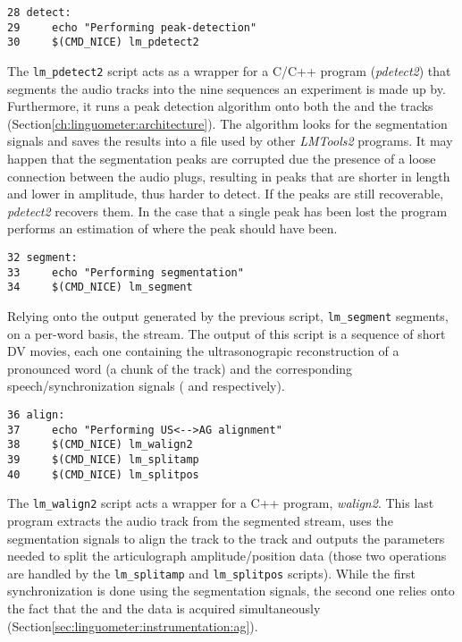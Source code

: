 \begin{scriptsize}
\begin{verbatim}
28 detect:
29     echo "Performing peak-detection"
30     $(CMD_NICE) lm_pdetect2
\end{verbatim}
\end{scriptsize}
The {\tt lm\_pdetect2} script acts as a wrapper for a C/C++ program 
(\emph{pdetect2}) that segments the  audio tracks into the nine 
sequences an experiment is made up by.
Furthermore, it runs a peak detection algorithm onto both the  
and the    tracks (Section\ref{ch:linguometer:architecture}).
The algorithm looks for the segmentation signals and saves the results
into a file used by other \emph{LMTools2} programs.
It may happen that the segmentation peaks are corrupted due the presence of a 
loose connection between the audio plugs, resulting in peaks that are shorter
in length and lower in amplitude, thus harder to detect.
If the peaks are still recoverable, \emph{pdetect2} recovers them. 
In the case that a single peak has been lost the program performs an estimation
of where the peak should have been.

\begin{scriptsize}
\begin{verbatim}
32 segment:
33     echo "Performing segmentation"
34     $(CMD_NICE) lm_segment
\end{verbatim}
\end{scriptsize}
Relying onto the output generated by the previous script, {\tt lm\_segment}
segments, on a per-word basis, the  stream.
The output of this script is a sequence of short DV movies, each one containing
the ultrasonograpic reconstruction of a pronounced word (a chunk of the
 track) and the corresponding speech/synchronization signals
( and  respectively).

\begin{scriptsize}
\begin{verbatim}
36 align:
37     echo "Performing US<-->AG alignment"
38     $(CMD_NICE) lm_walign2
39     $(CMD_NICE) lm_splitamp
40     $(CMD_NICE) lm_splitpos
\end{verbatim}
\end{scriptsize}
The {\tt lm\_walign2} script acts a wrapper for a C++ program, \emph{walign2}.
This last program extracts the audio track from the segmented  stream,
uses the segmentation signals to align the  track to the
 track and outputs the parameters needed to split the
articulograph amplitude/position data (those two operations are handled by
the {\tt lm\_splitamp} and {\tt lm\_splitpos} scripts).
While the first synchronization is done using the segmentation signals, the
second one relies onto the fact that the  and the  data
is acquired simultaneously (Section\ref{sec:linguometer:instrumentation:ag}).

